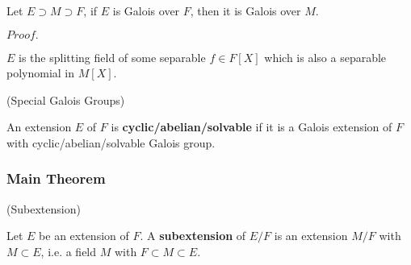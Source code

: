 \documentclass{article}
\newcommand{\Pf}[1]{$Proof.$\par}
\begin{document}
\begin{corollary}
    Let $E\supset M\supset F$, if $E$ is Galois over $F$, then it is Galois over $M$.
\end{corollary}
\Pf\par
    $E$ is the splitting field of some separable $f\in F[X]$ which is also a separable polynomial in $M[X]$.

\begin{definition}
    (Special Galois Groups)\par
    An extension $E$ of $F$ is \textbf{cyclic/abelian/solvable} if it is a Galois extension of $F$ with cyclic/abelian/solvable Galois group.
\end{definition}

\newpage

\subsubsection{Main Theorem}

\begin{definition}
    (Subextension)\par
    Let $E$ be an extension of $F$. A \textbf{subextension} of $E/F$ is an extension $M/F$ with $M\subset E$, i.e. a field $M$ with $F\subset M \subset E$.
\end{definition}
\end{document}
